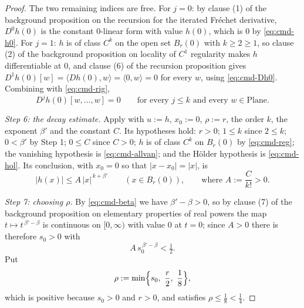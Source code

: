 \begin{proof}
The two remaining indices are free.  For $j=0$: by clause (1) of the background proposition on
the recursion for the iterated Fr\'echet derivative, $D^{0}h(0)$ is the constant $0$-linear form
with value $h(0)$, which is $0$ by \eqref{eq:cmd-h0}.  For $j=1$: $h$ is of class $C^{k}$ on the
open set $B_r(0)$ with $k\ge2\ge1$, so clause (2) of the background proposition on locality of
$C^{1}$ regularity makes $h$ differentiable at $0$, and clause (6) of the recursion proposition
gives $D^{1}h(0)[w]=\langle Dh(0),w\rangle=\langle0,w\rangle=0$ for every $w$, using
\eqref{eq:cmd-Dh0}.  Combining with \eqref{eq:cmd-rig},
\begin{equation}\label{eq:cmd-allvan}
  D^{j}h(0)[w,\ldots,w]=0\qquad\text{for every }j\le k\text{ and every }w\in\mathrm{Plane}.
\end{equation}

\medskip\noindent\emph{Step 6: the decay estimate.}
Apply  with $u:=h$, $x_0:=0$, $\rho:=r$, the order $k$, the
exponent $\beta'$ and the constant $C$.  Its hypotheses hold: $r>0$; $1\le k$ since $2\le k$;
$0<\beta'$ by Step 1; $0\le C$ since $C>0$; $h$ is of class $C^{k}$ on $B_r(0)$ by
\eqref{eq:cmd-reg}; the vanishing hypothesis is \eqref{eq:cmd-allvan}; and the H\"older
hypothesis is \eqref{eq:cmd-hol}.  Its conclusion, with $x_0=0$ so that $\lvert x-x_0\rvert
=\lvert x\rvert$, is
\begin{equation}\label{eq:cmd-decay}
  \lvert h(x)\rvert\le A\,\lvert x\rvert^{\,k+\beta'}\qquad(x\in B_r(0)),
  \qquad\text{where }A:=\frac{C}{k!}>0 .
\end{equation}

\medskip\noindent\emph{Step 7: choosing $\rho$.}
By \eqref{eq:cmd-beta} we have $\beta'-\beta>0$, so by clause (7) of the background proposition
on elementary properties of real powers the map $t\mapsto t^{\,\beta'-\beta}$ is continuous on
$[0,\infty)$ with value $0$ at $t=0$; since $A>0$ there is therefore $s_0>0$ with
\begin{equation}\label{eq:cmd-s0}
  A\,s_0^{\,\beta'-\beta}<\tfrac12 .
\end{equation}
Put
\[
  \rho:=\min\Bigl\{s_0,\ \frac r2,\ \frac18\Bigr\} ,
\]
which is positive because $s_0>0$ and $r>0$, and satisfies $\rho\le\tfrac18<\tfrac14$.


\end{proof}
